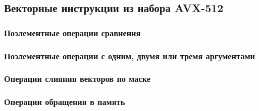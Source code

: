 \subsection{Векторные инструкции из набора AVX-512}

\cite{IntelSDM2025}

\subsubsection{Поэлементные операции сравнения}

\subsubsection{Поэлементные операции с одним, двумя или тремя аргументами}

\subsubsection{Операции слияния векторов по маске}

\subsubsection{Операции обращения в память}
